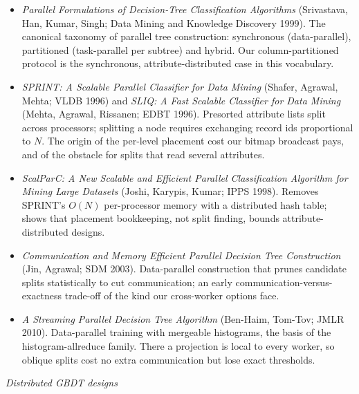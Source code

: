 \documentclass[sigconf,screen]{acmart}
\begin{document}
\begin{itemize}
    \item \textit{Parallel Formulations of Decision-Tree Classification Algorithms} (Srivastava, Han, Kumar, Singh; Data Mining and Knowledge Discovery 1999). The canonical taxonomy of parallel tree construction: synchronous (data-parallel), partitioned (task-parallel per subtree) and hybrid. Our column-partitioned protocol is the synchronous, attribute-distributed case in this vocabulary.
    \item \textit{SPRINT: A Scalable Parallel Classifier for Data Mining} (Shafer, Agrawal, Mehta; VLDB 1996) and \textit{SLIQ: A Fast Scalable Classifier for Data Mining} (Mehta, Agrawal, Rissanen; EDBT 1996). Presorted attribute lists split across processors; splitting a node requires exchanging record ids proportional to $N$. The origin of the per-level placement cost our bitmap broadcast pays, and of the obstacle for splits that read several attributes.
    \item \textit{ScalParC: A New Scalable and Efficient Parallel Classification Algorithm for Mining Large Datasets} (Joshi, Karypis, Kumar; IPPS 1998). Removes SPRINT's $O(N)$ per-processor memory with a distributed hash table; shows that placement bookkeeping, not split finding, bounds attribute-distributed designs.
    \item \textit{Communication and Memory Efficient Parallel Decision Tree Construction} (Jin, Agrawal; SDM 2003). Data-parallel construction that prunes candidate splits statistically to cut communication; an early communication-versus-exactness trade-off of the kind our cross-worker options face.
    \item \textit{A Streaming Parallel Decision Tree Algorithm} (Ben-Haim, Tom-Tov; JMLR 2010). Data-parallel training with mergeable histograms, the basis of the histogram-allreduce family. There a projection is local to every worker, so oblique splits cost no extra communication but lose exact thresholds.
\end{itemize}

\textit{Distributed GBDT designs}
\end{document}

